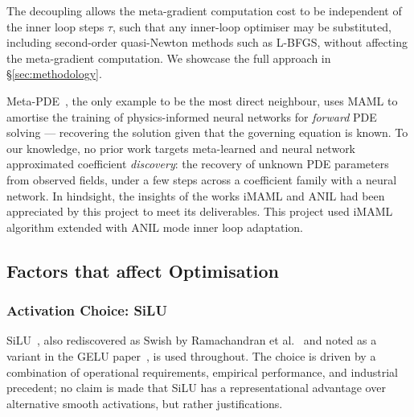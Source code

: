 \documentclass[10pt,journal,compsoc]{IEEEtran}
\begin{document}
The decoupling allows the meta-gradient computation cost to be independent of
the inner loop steps $\tau$, such that any inner-loop optimiser may be
substituted, including second-order quasi-Newton methods such as L-BFGS,
without affecting the meta-gradient computation. We showcase the full approach
in \S\ref{sec:methodology}.

Meta-PDE~\cite{qin2022}, the only example to be the most direct neighbour,
uses MAML to amortise the training of physics-informed neural networks for
\emph{forward} PDE solving --- recovering the solution given that the governing
equation is known. To our knowledge, no prior work targets meta-learned and
neural network approximated coefficient \emph{discovery}: the recovery of
unknown PDE parameters from observed fields, under a few steps across a
coefficient family with a neural network. In hindsight, the insights of the
works iMAML and ANIL had been appreciated by this project to meet its
deliverables. This project used iMAML algorithm extended with ANIL mode inner
loop adaptation.

\subsection{Factors that affect Optimisation}\label{subsec:approximation_theory}
\subsubsection{Activation Choice: SiLU}\label{subsubsec:silu_choice}

SiLU~\cite{elfwing2018}, also rediscovered as Swish by Ramachandran et al.~\cite{ramachandran2017} and noted as a variant in the GELU paper~\cite{hendrycks2016}, is used throughout. The
choice is driven by a combination of operational requirements, empirical
performance, and industrial precedent; no claim is made that SiLU has a
representational advantage over alternative smooth activations, but rather 
justifications.
\end{document}
